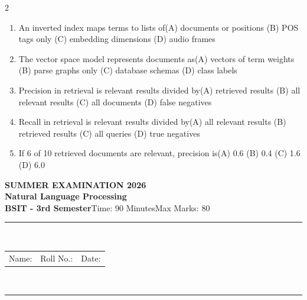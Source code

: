 \documentclass[a4paper]{article}
\makeatletter
\newcommand{\examheader}{%
\begin{center}\textbf{\large SUMMER EXAMINATION 2026}\\[-1pt]
\textbf{\normalsize Natural Language Processing}\\[-1pt]
\textbf{BSIT - 3rd Semester}\quad Time: 90 Minutes\quad Max Marks: 80\\[-1pt]
\textcolor{black!65}{\rule{\linewidth}{0.45pt}}\\[-2pt]
\begin{tabularx}{\linewidth}{@{}X X X@{}}Name: \hrulefill & Roll No.: \hrulefill & Date: \hrulefill\end{tabularx}\\[-1pt]
\textcolor{black!65}{\rule{\linewidth}{0.45pt}}\end{center}}
\makeatother
\begin{document}
\begin{multicols*}{2}
\begin{enumerate}
\item An inverted index maps terms to lists of\newline\hspace*{0.6em}(A) documents or positions \quad (B) POS tags only \newline\hspace*{0.6em}(C) embedding dimensions \quad (D) audio frames
\item The vector space model represents documents as\newline\hspace*{0.6em}(A) vectors of term weights \quad (B) parse graphs only \newline\hspace*{0.6em}(C) database schemas \quad (D) class labels
\item Precision in retrieval is relevant results divided by\newline\hspace*{0.6em}(A) retrieved results \quad (B) all relevant results \newline\hspace*{0.6em}(C) all documents \quad (D) false negatives
\item Recall in retrieval is relevant results divided by\newline\hspace*{0.6em}(A) all relevant results \quad (B) retrieved results \newline\hspace*{0.6em}(C) all queries \quad (D) true negatives
\item If 6 of 10 retrieved documents are relevant, precision is\newline\hspace*{0.6em}(A) 0.6 \quad (B) 0.4 \newline\hspace*{0.6em}(C) 1.6 \quad (D) 6.0
\end{enumerate}
\end{multicols*}
\newpage
\examheader
\raggedcolumns
\end{document}

